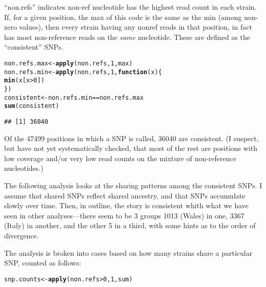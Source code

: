 \documentclass{article}\usepackage[]{graphicx}\usepackage[]{color}
\makeatletter
\newcommand{\hlnum}[1]{\textcolor[rgb]{0.686,0.059,0.569}{#1}}%
\newcommand{\hlopt}[1]{\textcolor[rgb]{0,0,0}{#1}}%
\newcommand{\hlstd}[1]{\textcolor[rgb]{0.345,0.345,0.345}{#1}}%
\newcommand{\hlkwa}[1]{\textcolor[rgb]{0.161,0.373,0.58}{\textbf{#1}}}%
\newcommand{\hlkwb}[1]{\textcolor[rgb]{0.69,0.353,0.396}{#1}}%
\newcommand{\hlkwc}[1]{\textcolor[rgb]{0.333,0.667,0.333}{#1}}%
\newcommand{\hlkwd}[1]{\textcolor[rgb]{0.737,0.353,0.396}{\textbf{#1}}}%
\newenvironment{kframe}{%
 \def\at@end@of@kframe{}%
 \ifinner\ifhmode%
  \def\at@end@of@kframe{\end{minipage}}%
  \begin{minipage}{\columnwidth}%
 \fi\fi%
 \def\FrameCommand##1{\hskip\@totalleftmargin \hskip-\fboxsep
 \colorbox{shadecolor}{##1}\hskip-\fboxsep
     \hskip-\linewidth \hskip-\@totalleftmargin \hskip\columnwidth}%
 \MakeFramed {\advance\hsize-\width
   \@totalleftmargin\z@ \linewidth\hsize
   \@setminipage}}%
 {\par\unskip\endMakeFramed%
 \at@end@of@kframe}
\newenvironment{knitrout}{}{} %
\makeatother
\begin{document}
``non.refs'' indicates non-ref nucleotide has the highest read count in each strain.  If, for a given position, the max
of this code is the same as the min (among non-zero values), then every strain having any nonref reads in that position,
in fact has most non-reference reads on the \emph{same} nucleotide.  These are defined as the ``consistent'' SNPs. 
\begin{knitrout}\small
{}\color{fgcolor}\begin{kframe}
\begin{alltt}
\hlstd{non.refs.max} \hlkwb{<-} \hlkwd{apply}\hlstd{(non.refs,} \hlnum{1}\hlstd{, max)}
\hlstd{non.refs.min} \hlkwb{<-} \hlkwd{apply}\hlstd{(non.refs,} \hlnum{1}\hlstd{,} \hlkwa{function}\hlstd{(}\hlkwc{x}\hlstd{) \{}
    \hlkwd{min}\hlstd{(x[x} \hlopt{>} \hlnum{0}\hlstd{])}
\hlstd{\})}
\hlstd{consistent} \hlkwb{<-} \hlstd{non.refs.min} \hlopt{==} \hlstd{non.refs.max}
\hlkwd{sum}\hlstd{(consistent)}
\end{alltt}
\begin{verbatim}
## [1] 36040
\end{verbatim}
\end{kframe}
\end{knitrout}

Of the 47499 positions in which a SNP is called, 36040 are consistent.  (I suspect, but have not yet
systematically checked, that most of the rest are positions with low coverage and/or very low read counts on the mixture
of non-reference nucleotides.)  

The following analysis looks at the sharing patterns among the consistent SNPs.  I assume that shared SNPs reflect shared
ancestry, and that SNPs accumulate slowly over time.  Then, in outline, the story is consistent whith what we have seen
in other analyses---there seem to be 3 groups 1013 (Wales) in one, 3367 (Italy) in another, and the other 5 in a third,
with some hints as to the order of divergence.

The analysis is broken into cases based on how many strains
share a particular SNP, counted as follows:
\begin{knitrout}\small
{}\color{fgcolor}\begin{kframe}
\begin{alltt}
\hlstd{snp.counts} \hlkwb{<-} \hlkwd{apply}\hlstd{(non.refs} \hlopt{>} \hlnum{0}\hlstd{,} \hlnum{1}\hlstd{, sum)}
\end{alltt}
\end{kframe}
\end{knitrout}
\end{document}
